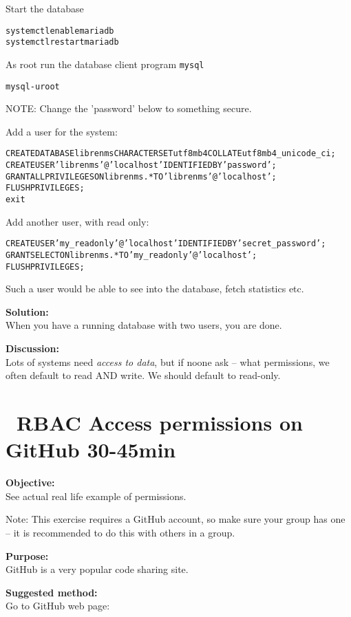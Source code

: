 \documentclass[a4paper,11pt,notitlepage]{report}
\begin{document}
Start the database
\begin{alltt}
systemctl enable mariadb
systemctl restart mariadb
\end{alltt}

As root run the database client program \verb+mysql+
\begin{alltt}
mysql -u root
\end{alltt}

NOTE: Change the 'password' below to something secure.

Add a user for the system:
\begin{alltt}
CREATE DATABASE librenms CHARACTER SET utf8mb4 COLLATE utf8mb4_unicode_ci;
CREATE USER 'librenms'@'localhost' IDENTIFIED BY 'password';
GRANT ALL PRIVILEGES ON librenms.* TO 'librenms'@'localhost';
FLUSH PRIVILEGES;
exit
\end{alltt}

Add another user, with read only:
\begin{alltt}
CREATE USER 'my_readonly'@'localhost' IDENTIFIED BY 'secret_password';
GRANT SELECT ON librenms.* TO 'my_readonly'@'localhost';
FLUSH PRIVILEGES;
\end{alltt}

Such a user would be able to see into the database, fetch statistics etc.

{\bf Solution:}\\
When you have a running database with two users, you are done.


{\bf Discussion:}\\
Lots of systems need \emph{access to data}, but if noone ask -- what permissions, we often default to read AND write. We should default to read-only.



\chapter{\faExclamationTriangle\ RBAC Access permissions on GitHub 30-45min}
\label{ex:github-perms}

{\bf Objective:}\\
See actual real life example of permissions.

Note: This exercise requires a GitHub account, so make sure your group has one -- it is recommended to do this with others in a group.

{\bf Purpose:}\\
GitHub is a very popular code sharing site.

{\bf Suggested method:}\\
Go to GitHub web page:\\
\end{document}
